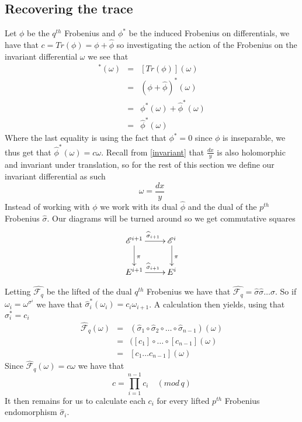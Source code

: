 \subsection{Recovering the trace}
Let $\phi$ be the $q^{th}$ Frobenius and $\phi^*$ be the induced Frobenius on differentials, 
we have that $c = Tr(\phi) = \phi + \widehat{\phi}$ so investigating the
action of the Frobenius on the invariant differential $\omega$ we see that
\begin{eqnarray}
 [Tr(\phi)]^*(\omega)&=& [Tr(\phi)](\omega) \nonumber \\
		     &=& (\phi + \widehat{\phi})^*(\omega) \nonumber \\
		     &=& \phi^*(\omega) + \widehat{\phi}^*(\omega) \nonumber \\
		     &=& \widehat{\phi}^*(\omega) \nonumber
\end{eqnarray}
Where the last equality is using the fact that $\phi^* = 0$ since $\phi$ is inseparable, we thus
get that $\widehat{\phi}^*(\omega) = c\omega$.
Recall from \ref{invariant} that $\frac{dx}{y}$ is also holomorphic and invariant under translation,
so for the rest of this section we define our invariant differential as such
$$ \omega = \frac{dx}{y} $$
Instead of working with $\phi$ we work with its dual $\widehat{\phi}$ and the dual
of the $p^{th}$ Frobenius $\widehat{\sigma}$. Our diagrams will be turned around so we get commutative
squares
$$
\xymatrix {
  \mathscr{E}^{i+1} \ar[r]^{\widehat{\sigma}_{i+1}} \ar[d]^\pi & \mathscr{E}^i \ar[d]^\pi \\
  E^{i+1} \ar[r]^{\widehat{\sigma}_{i+1}} & E^i 
}
$$

Letting $\widehat{\mathscr{F}_q}$ be the lifted of the dual $q^{th}$ Frobenius we have that
$\widehat{\mathscr{F}_q} = \widehat{\sigma} \widehat{\sigma} \ldots \widehat{\sigma}$.
So if $\omega_i = \omega^{\sigma^i}$ we have that $\widehat{\sigma}_i^*(\omega_i) = c_i \omega_{i+1}$.
A calculation then yields, using that $\sigma_i^* = c_i$
\begin{eqnarray}
  \widehat{\mathscr{F}}_q(\omega) &=& (\widehat{\sigma}_1 \circ \widehat{\sigma}_2 \circ \ldots \circ \widehat{\sigma}_{n-1})(\omega) \nonumber \\
			      &=& ([c_1] \circ \ldots \circ [c_{n-1}](\omega) \nonumber \\
			      &=& [c_1\ldots c_{n-1}](\omega) \nonumber
\end{eqnarray}
Since $\widehat{\mathscr{F}}_q(\omega) = c \omega$ we have that
$$ c = \prod_{i=1}^{n-1} c_i \quad (mod\, q) $$
It then remains for us to calculate each $c_i$ for every lifted $p^{th}$ Frobenius
endomorphism $\widehat{\sigma}_i$.


